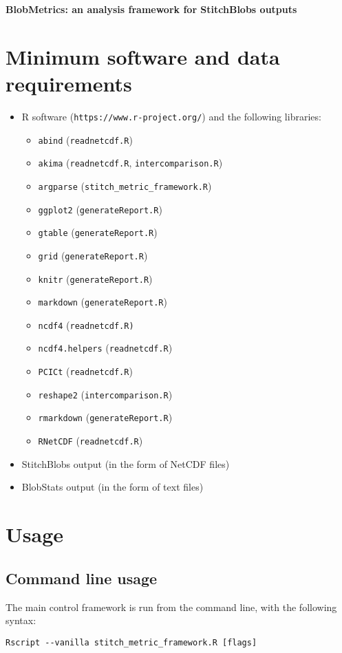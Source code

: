 \documentclass{article}
\begin{document}
{\Huge \textbf{BlobMetrics: an analysis framework for StitchBlobs outputs}}
\tableofcontents

\pagebreak

\section{Minimum software and data requirements}
\begin{itemize}
\item R software (\texttt{https://www.r-project.org/}) and the following libraries:
\begin{itemize}
\item \texttt{abind} (\texttt{readnetcdf.R})
\item \texttt{akima} (\texttt{readnetcdf.R}, \texttt{intercomparison.R})
\item \texttt{argparse} (\texttt{stitch\_metric\_framework.R})
\item \texttt{ggplot2} (\texttt{generateReport.R})
\item \texttt{gtable} (\texttt{generateReport.R})
\item \texttt{grid} (\texttt{generateReport.R})
\item \texttt{knitr} (\texttt{generateReport.R})
\item \texttt{markdown} (\texttt{generateReport.R})
\item \texttt{ncdf4} (\texttt{readnetcdf.R)}
\item \texttt{ncdf4.helpers} (\texttt{readnetcdf.R})
\item \texttt{PCICt} (\texttt{readnetcdf.R})
\item \texttt{reshape2} (\texttt{intercomparison.R})
\item \texttt{rmarkdown} (\texttt{generateReport.R})
\item \texttt{RNetCDF} (\texttt{readnetcdf.R})
\end{itemize}
\item StitchBlobs output (in the form of NetCDF files)
\item BlobStats output (in the form of text files)
\end{itemize}



\section{Usage}
\subsection{Command line usage}
The main control framework is run from the command line, with the following syntax:
\begin{verbatim}
Rscript --vanilla stitch_metric_framework.R [flags]
\end{verbatim}
\end{document}
